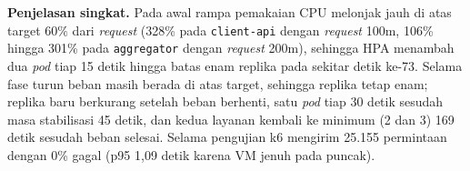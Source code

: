 \textbf{Penjelasan singkat.} Pada awal rampa pemakaian CPU melonjak jauh di atas target $60\%$ dari \textit{request} (328\% pada \texttt{client-api} dengan \textit{request} 100m, 106\% hingga 301\% pada \texttt{aggregator} dengan \textit{request} 200m), sehingga HPA menambah dua \textit{pod} tiap 15 detik hingga batas enam replika pada sekitar detik ke-73. Selama fase turun beban masih berada di atas target, sehingga replika tetap enam; replika baru berkurang setelah beban berhenti, satu \textit{pod} tiap 30 detik sesudah masa stabilisasi 45 detik, dan kedua layanan kembali ke minimum (2 dan 3) 169 detik sesudah beban selesai. Selama pengujian k6 mengirim 25.155 permintaan dengan 0\% gagal (p95 1,09 detik karena VM jenuh pada puncak).

